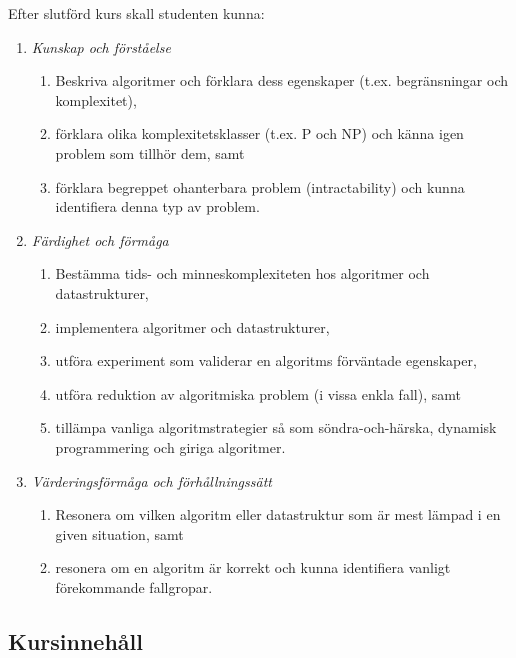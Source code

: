 Efter slutförd kurs skall studenten kunna:

\begin{enumerate}
\def\labelenumi{\Alph{enumi}.}
\tightlist
\item
  \emph{Kunskap och förståelse}

  \begin{enumerate}
  \def\labelenumii{\Alph{enumi}.\arabic{enumii}.}
  \tightlist
  \item
    Beskriva algoritmer och förklara dess egenskaper (t.ex.
    begränsningar och komplexitet),
  \item
    förklara olika komplexitetsklasser (t.ex. P och NP) och känna igen
    problem som tillhör dem, samt
  \item
    förklara begreppet ohanterbara problem (intractability) och kunna
    identifiera denna typ av problem.
  \end{enumerate}
\item
  \emph{Färdighet och förmåga}

  \begin{enumerate}
  \def\labelenumii{\Alph{enumi}.\arabic{enumii}.}
  \tightlist
  \item
    Bestämma tids- och minneskomplexiteten hos algoritmer och
    datastrukturer,
  \item
    implementera algoritmer och datastrukturer,
  \item
    utföra experiment som validerar en algoritms förväntade egenskaper,
  \item
    utföra reduktion av algoritmiska problem (i vissa enkla fall), samt
  \item
    tillämpa vanliga algoritmstrategier så som söndra-och-härska,
    dynamisk programmering och giriga algoritmer.
  \end{enumerate}
\item
  \emph{Värderingsförmåga och förhållningssätt}

  \begin{enumerate}
  \def\labelenumii{\Alph{enumi}.\arabic{enumii}.}
  \tightlist
  \item
    Resonera om vilken algoritm eller datastruktur som är mest lämpad i
    en given situation, samt
  \item
    resonera om en algoritm är korrekt och kunna identifiera vanligt
    förekommande fallgropar.
  \end{enumerate}
\end{enumerate}

\subsection*{Kursinnehåll}

